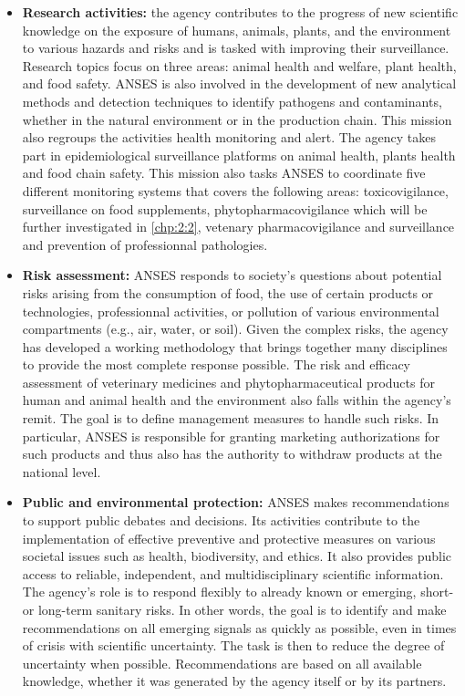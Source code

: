 \begin{itemize}
\item \textbf{Research activities:} the agency contributes to the progress of new scientific knowledge on the exposure of humans, animals, plants, and the environment to various hazards and risks and is tasked with improving their surveillance. Research topics focus on three areas: animal health and welfare, plant health, and food safety. ANSES is also involved in the development of new analytical methods and detection techniques to identify pathogens and contaminants, whether in the natural environment or in the production chain. This mission also regroups the activities health monitoring and alert. The agency takes part in epidemiological surveillance platforms on animal health, plants health and food chain safety. This mission also tasks ANSES to coordinate five different monitoring systems that covers the following areas: toxicovigilance, surveillance on food supplements, phytopharmacovigilance which will be further investigated in \ref{chp:2:2}, vetenary pharmacovigilance and surveillance and prevention of professionnal pathologies.      
\item \textbf{Risk assessment:} ANSES responds to society's questions about potential risks arising from the consumption of food, the use of certain products or technologies, professionnal activities, or pollution of various environmental compartments (e.g., air, water, or soil). Given the complex risks, the agency has developed a working methodology that brings together many disciplines to provide the most complete response possible. The risk and efficacy assessment of veterinary medicines and phytopharmaceutical products for human and animal health and the environment also falls within the agency's remit. The goal is to define management measures to handle such risks. In particular, ANSES is responsible for granting marketing authorizations for such products and thus also has the authority to withdraw products at the national level. 
\item \textbf{Public and environmental protection:} ANSES makes recommendations to support public debates and decisions. Its activities contribute to the implementation of effective preventive and protective measures on various societal issues such as health, biodiversity, and ethics. It also provides public access to reliable, independent, and multidisciplinary scientific information. The agency's role is to respond flexibly to already known or emerging, short- or long-term sanitary risks. In other words, the goal is to identify and make recommendations on all emerging signals as quickly as possible, even in times of crisis with scientific uncertainty. The task is then to reduce the degree of uncertainty when possible. Recommendations are based on all available knowledge, whether it was generated by the agency itself or by its partners. 
\end{itemize}



